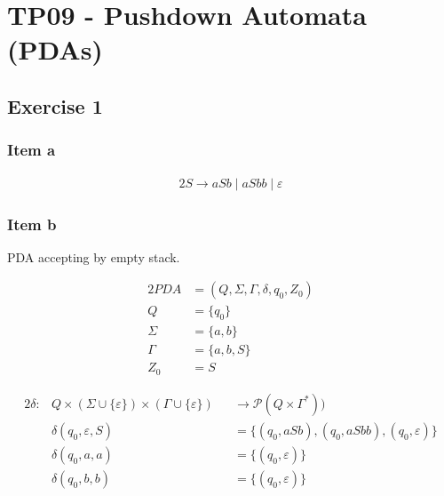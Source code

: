 \setcounter{section}{8}
\section{TP09 - Pushdown Automata (PDAs)}
{
\renewcommand{\thesubsubsection}{\thesubsection\alph{subsubsection}}
\subsection{Exercise 1}
\subsubsection{Item a}
\begin{alignat*}{2}
	S \rightarrow aSb\mid aSbb\mid \varepsilon
\end{alignat*}
\subsubsection{Item b} \label{TP09_1b}
PDA accepting by empty stack.
\begin{center}
\begin{minipage}[c]{0.30\textwidth}
\begin{alignat*}{2}
	PDA    &= (Q, \Sigma, \Gamma, \delta, q_0, Z_0)\\
	Q      &= \{q_0\}\\
	\Sigma &= \{a,b\}\\
	\Gamma &= \{a,b,S\}\\
	Z_0    &= S
\end{alignat*}
\end{minipage}%
\begin{minipage}[c]{0.65\textwidth}
\begin{alignat*}{2}
	\delta \colon & Q \times (\Sigma \cup \{\varepsilon\}) \times (\Gamma \cup \{\varepsilon\}) &&\rightarrow \mathscr{P}(Q \times \Gamma^*))\\
	&\delta(q_0, \varepsilon, S) &&=\{(q_0, aSb), (q_0, aSbb), (q_0, \varepsilon)\}\\
	&\delta(q_0, a, a) &&= \{(q_0, \varepsilon)\}\\
	&\delta(q_0, b, b) &&= \{(q_0, \varepsilon)\}
\end{alignat*}
\end{minipage}
\end{center}
}
